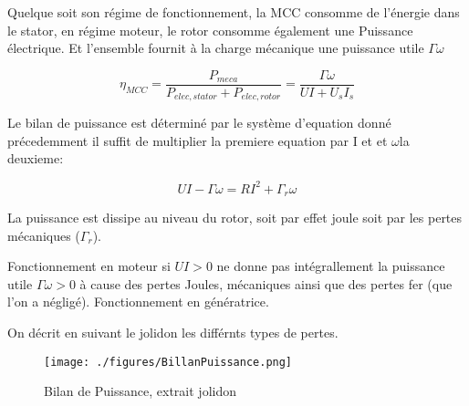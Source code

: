 \documentclass[french, a4paper, 10pt, twocolumn, landscape]{article}
\begin{document}
Quelque soit son régime de fonctionnement, la MCC consomme de l'énergie dans le stator, en régime moteur, le rotor consomme également une Puissance électrique. Et l'ensemble fournit à la charge mécanique une puissance utile $\Gamma\omega$




\begin{equation}
	\eta_{MCC} = \dfrac{P_{meca}}{P_{elec, stator}+P_{elec,rotor}}
=\dfrac{\Gamma\omega}{UI+U_sI_s}\end{equation}


Le bilan de puissance est déterminé par le système d'equation donné précedemment il suffit de multiplier la premiere equation par I et et $\omega$la deuxieme: 


\begin{equation}
	UI-\Gamma\omega = RI^2+\Gamma_r\omega
\end{equation}

La puissance est dissipe au niveau du rotor, soit par effet joule soit par les pertes mécaniques ($\Gamma_r$). 

Fonctionnement en moteur si $UI>0$ ne donne pas intégrallement la puissance utile $\Gamma\omega>0$ à cause des pertes Joules, mécaniques ainsi que des pertes fer (que l'on a négligé). Fonctionnement en génératrice.

On décrit en suivant le jolidon les différnts types de pertes.

\begin{figure}[ht]
	\centering
	\texttt{[image: ./figures/BillanPuissance.png]}
	\caption{Bilan de Puissance, extrait jolidon}
\end{figure}


\end{document}
